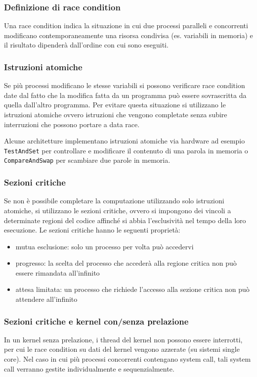 \documentclass[a4paper]{article}
\begin{document}
\subsubsection*{Definizione di race condition}
Una race condition indica la situazione in cui due processi paralleli e concorrenti modificano contemporaneamente una risorsa
condivisa (es. variabili in memoria) e il risultato dipenderà dall'ordine con cui sono eseguiti.

\subsubsection*{Istruzioni atomiche}
Se più processi modificano le stesse variabili si possono verificare race condition date dal fatto che la modifica fatta da
un programma può essere sovrascritta da quella dall'altro programma. Per evitare questa situazione si utilizzano le istruzioni
atomiche ovvero istruzioni che vengono completate senza subire interruzioni che possono portare a data race.

Alcune architetture implementano istruzioni atomiche via hardware ad esempio \verb|TestAndSet| per controllare e modificare il
contenuto di una parola in memoria o \verb|CompareAndSwap| per scambiare due parole in memoria.

\subsubsection*{Sezioni critiche}
Se non è possibile completare la computazione utilizzando solo istruzioni atomiche, si utilizzano le sezioni critiche, ovvero
si impongono dei vincoli a determinate regioni del codice affinché si abbia l'esclusività nel tempo della loro esecuzione. Le
sezioni critiche hanno le seguenti proprietà:
\begin{itemize}
	\item mutua esclusione: solo un processo per volta può accedervi
	\item progresso: la scelta del processo che accederà alla regione critica non può essere rimandata all'infinito
	\item attesa limitata: un processo che richiede l'accesso alla sezione critica non può attendere all'infinito
\end{itemize}

\subsubsection*{Sezioni critiche e kernel con/senza prelazione}
In un kernel senza prelazione, i thread del kernel non possono essere interrotti, per cui le race condition su dati del kernel
vengono azzerate (su sistemi single core). Nel caso in cui più processi concorrenti contengano system call, tali system call
verranno gestite individualmente e sequenzialmente.
\end{document}
